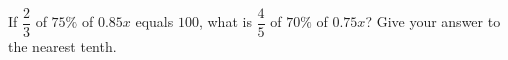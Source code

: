 If $\dfrac23$ of $75\%$ of $0.85x$ equals $100$, what is $\dfrac45$ of $70\%$ of $0.75x$? Give your answer to the nearest tenth.
